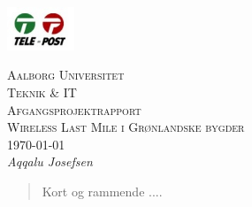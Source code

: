 \documentclass[11pt,a4paper]{report}
\begin{document}
\begin{titlepage}
 \begin{flushright}
  \includegraphics[width=0.15\textwidth]{./telelogo}~\\[1cm] %
 \end{flushright}
 \begin{center}
  \textsc{\LARGE Aalborg Universitet}\\[.5cm]
  \textsc{\Large  Teknik \& IT}\\[.5cm]
  \textsc{\large  Afgangsprojektrapport}\\[3cm]
  \textsc{\huge Wireless Last Mile i Grønlandske bygder}\\[3cm]
  \large \today\\[0.5cm]
  \emph{Aqqalu Josefsen}\\[0.6cm]
 \end{center}
\end{titlepage}

\begin{abstract}
Kort og rammende ....
\end{abstract}

\renewcommand\appendixname{Appendix}
\begin{appendices}
\end{appendices}

\nocite{*}
\printbibliography
\printbibliography[title=Referencer]
\end{document}
